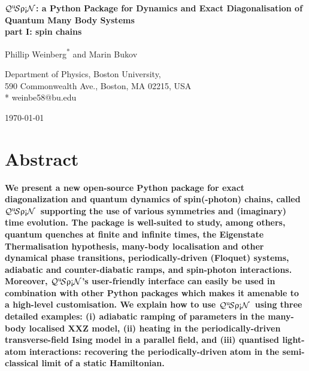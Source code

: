 \documentclass{SciPost}
\newcommand\0{\scalebox{-1}[1]{0}}
\newcommand{\qspin}{$\mathcal{Q}^{\mathrm{u}}\!\mathcal{S}\uprho\mathrm{\text{\textexclamdown}}\mathcal{N}$}
\begin{document}
\begin{center}{\Large \textbf{
\qspin: a Python Package for Dynamics and Exact Diagonalisation of Quantum Many Body Systems\\
\large part I: spin chains
}}\end{center}

\begin{center}
Phillip Weinberg\textsuperscript{*} and Marin Bukov
\end{center}

\begin{center}
Department of Physics, Boston University, \\
590 Commonwealth Ave., Boston, MA 02215, USA
\\
* weinbe58@bu.edu
\end{center}

\begin{center}
\today
\end{center}


\section*{Abstract}
{\bf 
We present a new open-source Python package for exact diagonalization and quantum dynamics of spin(-photon) chains, called \qspin\, supporting the use of various symmetries and (imaginary) time evolution. The package is well-suited to study, among others, quantum quenches at finite and infinite times, the Eigenstate Thermalisation hypothesis, many-body localisation and other dynamical phase transitions, periodically-driven (Floquet) systems, adiabatic and counter-diabatic ramps, and spin-photon interactions. Moreover, \qspin's user-friendly interface can easily be used in combination with other Python packages which makes it amenable to a high-level customisation. We explain how to use \qspin\ using three detailed examples: (i) adiabatic ramping of parameters in the many-body localised XXZ model, (ii) heating in the periodically-driven transverse-field Ising model in a parallel field, and (iii) quantised light-atom interactions: recovering the periodically-driven atom in the semi-classical limit of a static Hamiltonian.
}
\end{document}
